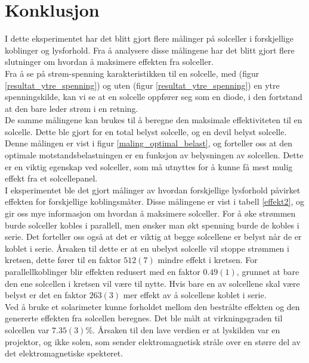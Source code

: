 \documentclass[%
 reprint,
 amsmath,amssymb,
 aps,
 norsk,
 booktabs
]{revtex4-1}
\begin{document}
\section{Konklusjon}
I dette eksperimentet har det blitt gjort flere målinger på solceller i forskjellige koblinger og lysforhold. Fra å analysere disse målingene har det blitt gjort flere slutninger om hvordan å maksimere effekten fra solceller.\\
Fra å se på strøm-spenning karakteristikken til en solcelle,
med (figur \vref{resultat_ytre_spenning}) og uten (figur \vref{resultat_ytre_spenning}) en ytre spenningskilde, kan vi se at en solcelle oppfører seg som en diode, i den fortstand at den bare leder strøm i en retning. \\
De samme målingene kan brukes til å beregne den maksimale effektiviteten til en solcelle. Dette ble gjort for en total belyst solcelle, og en devil belyst solcelle. Denne målingen er vist i figur \vref{maling_optimal_belast}, og forteller oss at den optimale motstandsbelastningen er en funksjon av belysningen av solcellen. Dette er en viktig egenskap ved solceller, som må utnyttes for å kunne få mest mulig effekt fra et solcellepanel.\\
I eksperimentet ble det gjort målinger av hvordan forskjellige lysforhold påvirket effekten for forskjellige koblingsmåter. Disse målingene er vist i tabell \vref{effekt2}, og gir oss mye informasjon om hvordan å maksimere solceller. For å øke strømmen burde solceller kobles i parallell, men ønsker man økt spenning burde de kobles i serie. Det forteller oss også at det er viktig at begge solcellene er belyst når de er koblet i serie. Årsaken til dette er at en ubelyst solcelle vil stoppe strømmen i kretsen, dette fører til en faktor $512(7)$ mindre effekt i kretsen. For parallellkoblinger blir effekten redusert med en faktor $0.49(1)$, grunnet at bare den ene solcellen i kretsen vil være til nytte. Hvis bare en av solcellene skal være belyst er det en faktor $263(3)$ mer effekt av å solcellene koblet i serie.\\
Ved å bruke et solarimeter kunne forholdet mellom den bestrålte effekten og den genererte effekten fra solcellen beregnes. Det ble målt at virkningsgraden til solcellen var $7.35(3)\%$. Årsaken til den lave verdien er at lyskilden var en projektor, og ikke solen, som sender elektromagnetisk stråle over en større del av det elektromagnetiske spekteret.
\end{document}
